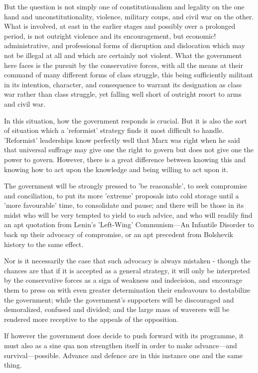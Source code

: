 But the question is not simply one of constitutionalism and legality on the one hand and unconstitutionality, violence, military coups, and civil war on the other. What is involved, at east in the earlier stages and possibly over a prolonged period, is not outright violence and its encouragement, but economic! administrative, and professional forms of disruption and dislocation which may not be illegal at all and which are certainly not violent. What the government here faces is the pursuit by the conservative forces, with all the means at their command of many different forms of class struggle, this being sufficiently militant in its intention, character, and consequence to warrant its designation as class war rather than class struggle, yet falling well short of outright resort to arms and civil war.

In this situation, how the government responds is crucial. But it is also the sort of situation which a 'reformist' strategy finds it most difficult to handle. 'Reformist' leaderships know perfectly well that Marx was right when he said that universal suffrage may give one the right to govern but does not give one the power to govern. However, there is a great difference between knowing this and knowing how to act upon the knowledge and being willing to act upon it.

The government will be strongly pressed to 'be reasonable', to seek compromise and conciliation, to put its more 'extreme' proposals into cold storage until a 'more favourable' time, to consolidate and pause; and there will be those in its midst who will be very tempted to yield to such advice, and who will readily find an apt quotation from Lenin's 'Left-Wing' Communism—An Infantile Disorder to back up their advocacy of compromise, or an apt precedent from Bolshevik history to the same effect.

Nor is it necessarily the case that such advocacy is always mistaken - though the chances are that if it is accepted as a general strategy, it will only be interpreted by the conservative forces as a sign of weakness and indecision, and encourage them to press on with even greater determination their endeavours to destabilize the government; while the government's supporters will be discouraged and demoralized, confused and divided; and the large mass of waverers will be rendered more receptive to the appeals of the opposition.

If however the government does decide to push forward with its programme, it must also as a sine qua non strengthen itself in order to make advance—and survival—possible. Advance and defence are in this instance one and the same thing.

